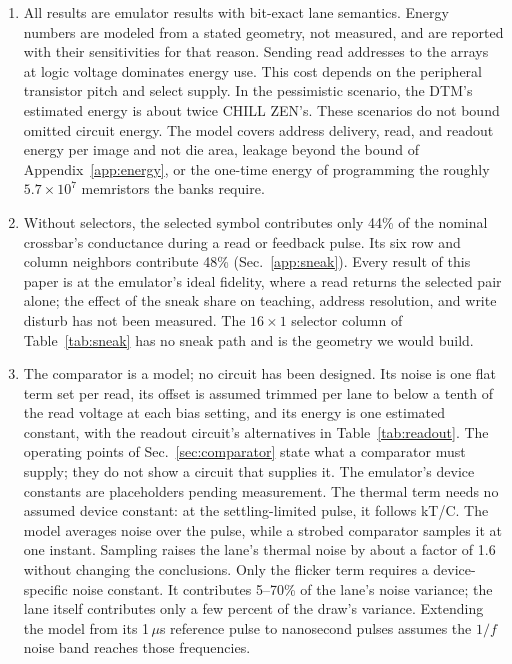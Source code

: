 \documentclass[reprint,amsmath,amssymb,aps,nofootinbib]{revtex4-2}
\begin{document}
\begin{enumerate}
\item All results are emulator results with bit-exact lane semantics.
    Energy numbers are modeled from a stated
  geometry, not measured, and are reported with their sensitivities for
  that reason. Sending read addresses to the arrays at logic voltage dominates energy
  use. This cost depends on the peripheral transistor pitch and select
  supply. In the pessimistic scenario, the DTM's estimated energy is
  about twice CHILL ZEN's. These scenarios do not bound omitted circuit energy. The model
  covers address delivery, read, and readout energy per image and not
  die area, leakage beyond the bound of Appendix~\ref{app:energy}, or
  the one-time energy of programming the roughly $5.7\times10^{7}$
  memristors the banks require.
\item\label{lim:sneak} Without selectors, the selected symbol contributes only 44\% of the
  nominal crossbar's conductance during a read or feedback pulse. Its
  six row and column neighbors contribute 48\% (Sec.~\ref{app:sneak}). Every
  result of this paper is at the emulator's ideal fidelity, where a
  read returns the selected pair alone; the effect of the sneak share
  on teaching, address resolution, and write disturb has not been
  measured. The $16 \times 1$ selector column of Table~\ref{tab:sneak}
  has no sneak path and is the geometry we would build.
\item The comparator is a model; no circuit has been designed. Its noise is one flat
  term set per read, its offset is assumed trimmed per lane to below a
  tenth of the read voltage at each bias setting, and
  its energy is one estimated constant, with the readout circuit's
  alternatives in Table~\ref{tab:readout}. The operating points of
  Sec.~\ref{sec:comparator} state what a comparator must supply; they
  do not show a circuit that supplies it. The emulator's device
  constants are placeholders pending measurement. The thermal term needs no assumed device constant: at the
  settling-limited pulse, it follows kT/C. The model averages noise over
  the pulse, while a strobed comparator samples it at one instant.
  Sampling raises the lane's thermal noise by about a factor of 1.6
  without changing the conclusions. Only the flicker term requires a device-specific noise constant. It
  contributes 5--70\% of the lane's noise variance; the lane itself
  contributes only a few percent of the draw's variance. Extending the
  model from its 1\,$\mu$s reference pulse to nanosecond pulses assumes
  the $1/f$ noise band reaches those frequencies.

\end{enumerate}
\end{document}
